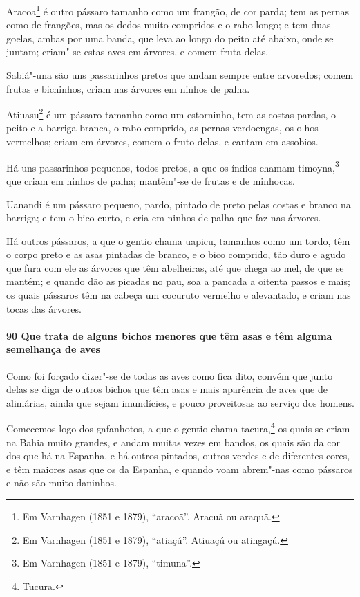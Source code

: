 Aracoa\footnote{ Em Varnhagen (1851 e 1879), ``aracoã''. Aracuã ou araquã.} é outro
pássaro tamanho como um frangão, de cor parda; tem as pernas como de frangões, mas os
dedos muito compridos e o rabo longo; e tem duas goelas, ambas por uma banda, que leva ao
longo do peito até abaixo, onde se juntam; criam"-se estas aves em árvores, e comem fruta
delas.

Sabiá"-una são uns passarinhos pretos que andam sempre entre arvoredos; comem frutas e
bichinhos, criam nas árvores em ninhos de palha.

Atiuasu\footnote{ Em Varnhagen (1851 e 1879), ``atiaçú''. Atiuaçú ou atingaçú.} é um
pássaro tamanho como um estorninho, tem as costas pardas, o peito e a barriga branca, o
rabo comprido, as pernas verdoengas, os olhos vermelhos; criam em árvores, comem o fruto
delas, e cantam em assobios.

Há uns passarinhos pequenos, todos pretos, a que os índios chamam timoyna,\footnote{ Em
Varnhagen (1851 e 1879), ``timuna''.} que criam em ninhos de palha; mantêm"-se de frutas e
de minhocas.

Uanandi é um pássaro pequeno, pardo, pintado de preto pelas costas e branco na barriga; e
tem o bico curto, e cria em ninhos de palha que faz nas árvores.

Há outros pássaros, a que o gentio chama uapicu, tamanhos como um tordo, têm o corpo preto
e as asas pintadas de branco, e o bico comprido, tão duro e agudo que fura com ele as
árvores que têm abelheiras, até que chega ao mel, de que se mantém; e quando dão as
picadas no pau, soa a pancada a oitenta passos e mais; os quais pássaros têm na cabeça um
cocuruto vermelho e alevantado, e criam nas tocas das árvores.

\paragraph{90 Que trata de alguns bichos menores que têm asas e têm alguma semelhança de
aves}

Como foi forçado dizer"-se de todas as aves como fica dito, convém que junto delas se diga
de outros bichos que têm asas e mais aparência de aves que de alimárias, ainda que sejam
imundícies, e pouco proveitosas ao serviço dos homens.

Comecemos logo dos gafanhotos, a que o gentio chama tacura,\footnote{ Tucura.} os quais se
criam na Bahia muito grandes, e andam muitas vezes em bandos, os quais são da cor dos que
há na Espanha, e há outros pintados, outros verdes e de diferentes cores, e têm maiores
asas que os da Espanha, e quando voam abrem"-nas como pássaros e não são muito daninhos.

